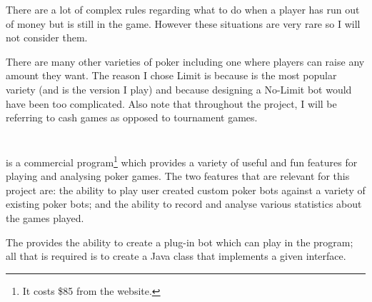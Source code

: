 There are a lot of complex rules regarding what to do when a player has run out of money but is still in the game. However these situations are very rare so I will not consider them.

There are many other varieties of poker including one where players can raise any amount they want. The reason I chose Limit \texas is because \texas is the most popular variety (and is the version I play) and because designing a No-Limit bot would have been too complicated. Also note that throughout the project, I will be referring to cash games as opposed to tournament games.




\section{\pap}									%



\pap \cite{pa} is a commercial program\footnote{It costs \$85 from the \pa website.} which provides a variety of useful and fun features for playing and analysing poker games. The two features that are relevant for this project are: the ability to play user created custom poker bots against a variety of existing poker bots; and the ability to record and analyse various statistics about the games played.

The \meer \cite{meer} provides the ability to create a plug-in bot which can play in the \pa program; all that is required is to create a Java class that implements a given interface.

